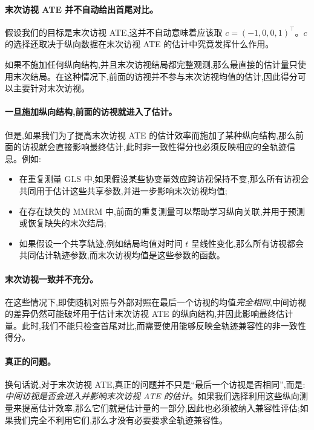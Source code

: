 \documentclass[11pt]{article}
\begin{document}
\paragraph{末次访视 ATE 并不自动给出首尾对比。}
假设我们的目标是末次访视 ATE,这并不自动意味着应该取 $c=(-1,0,0,1)^{\top}$。$c$ 的选择还取决于纵向数据在末次访视 ATE 的估计中究竟发挥什么作用。

如果不施加任何纵向结构,并且末次访视结局都完整观测,那么最直接的估计量只使用末次结局。在这种情况下,前面的访视并不参与末次访视均值的估计,因此得分可以主要针对末次访视。

\paragraph{一旦施加纵向结构,前面的访视就进入了估计。}
但是,如果我们为了提高末次访视 ATE 的估计效率而施加了某种纵向结构,那么前面的访视就会直接影响最终估计,此时非一致性得分也必须反映相应的全轨迹信息。例如:
\begin{itemize}[leftmargin=*,itemsep=2pt,topsep=3pt]
\item 在重复测量 GLS 中,如果假设某些协变量效应跨访视保持不变,那么所有访视会共同用于估计这些共享参数,并进一步影响末次访视均值;
\item 在存在缺失的 MMRM 中,前面的重复测量可以帮助学习纵向关联,并用于预测或恢复缺失的末次结局;
\item 如果假设一个共享轨迹,例如结局均值对时间 $t$ 呈线性变化,那么所有访视都会共同估计轨迹参数,而末次访视均值是这些参数的函数。
\end{itemize}

\paragraph{末次访视一致并不充分。}
在这些情况下,即使随机对照与外部对照在最后一个访视的均值\emph{完全相同},中间访视的差异仍然可能破坏用于估计末次访视 ATE 的纵向结构,并因此影响最终估计量。此时,我们不能只检查首尾对比,而需要使用能够反映全轨迹兼容性的非一致性得分。

\paragraph{真正的问题。}
换句话说,对于末次访视 ATE,真正的问题并不只是``最后一个访视是否相同'',而是:\emph{中间访视是否会进入并影响末次访视 ATE 的估计}。如果我们选择利用这些纵向测量来提高估计效率,那么它们就是估计量的一部分,因此也必须被纳入兼容性评估;如果我们完全不利用它们,那么才没有必要要求全轨迹兼容性。
\end{document}
